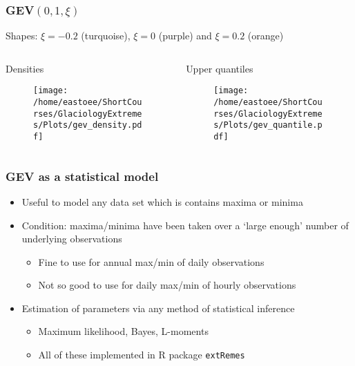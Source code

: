 \documentclass[dvipsnames]{beamer}
\begin{document}
\begin{frame}
\frametitle{GEV$(0,1,\xi)$}
Shapes: $\xi=-0.2$ (turquoise), $\xi=0$ (purple) and $\xi=0.2$ (orange)
\begin{columns}[T]
\begin{column}{0.5\textwidth}
\vfill
Densities 
\begin{figure}
\centering
{\texttt{[image: /home/eastoee/ShortCourses/GlaciologyExtremes/Plots/gev\_density.pdf]}}
\end{figure}
\vfill
\end{column}
\hfill
\begin{column}{0.5\textwidth}
Upper quantiles
\begin{figure}
\centering
{\texttt{[image: /home/eastoee/ShortCourses/GlaciologyExtremes/Plots/gev\_quantile.pdf]}}
\end{figure}
\end{column}
\end{columns}
\end{frame}

\begin{frame}
\frametitle{GEV as a statistical model}
\begin{itemize}
\item
Useful to model any data set which is contains maxima or minima
\item
Condition: maxima/minima have been taken over a `large enough' number of underlying observations
\begin{itemize}
\item
Fine to use for annual max/min of daily observations
\item
Not so good to use for daily max/min of hourly observations 
\end{itemize}
\item
Estimation of parameters via any method of statistical inference
\begin{itemize}
\item 
Maximum likelihood, Bayes, L-moments
\item 
All of these implemented in \textsf{R} package \texttt{extRemes}
\end{itemize}
\end{itemize}
\end{frame}
\end{document}
